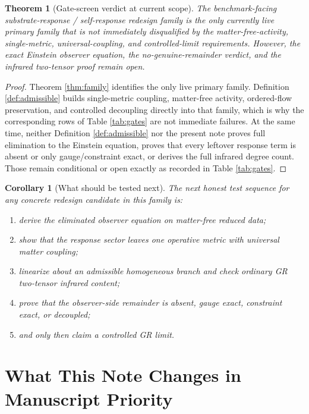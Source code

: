 \documentclass[11pt]{article}
\newtheorem{corollary}{Corollary}
\newtheorem{theorem}{Theorem}
\begin{document}
\begin{theorem}[Gate-screen verdict at current scope]
\label{thm:gates}
The benchmark-facing substrate-response / self-response redesign family is the only currently live primary family that is not immediately disqualified by the matter-free-activity, single-metric, universal-coupling, and controlled-limit requirements. However, the exact Einstein observer equation, the no-genuine-remainder verdict, and the infrared two-tensor proof remain open.
\end{theorem}

\begin{proof}
Theorem \ref{thm:family} identifies the only live primary family. Definition \ref{def:admissible} builds single-metric coupling, matter-free activity, ordered-flow preservation, and controlled decoupling directly into that family, which is why the corresponding rows of Table \ref{tab:gates} are not immediate failures. At the same time, neither Definition \ref{def:admissible} nor the present note proves full elimination to the Einstein equation, proves that every leftover response term is absent or only gauge/constraint exact, or derives the full infrared degree count. Those remain conditional or open exactly as recorded in Table \ref{tab:gates}.
\end{proof}

\begin{corollary}[What should be tested next]
\label{cor:next}
The next honest test sequence for any concrete redesign candidate in this family is:
\begin{enumerate}
    \item derive the eliminated observer equation on matter-free reduced data;
    \item show that the response sector leaves one operative metric with universal matter coupling;
    \item linearize about an admissible homogeneous branch and check ordinary GR two-tensor infrared content;
    \item prove that the observer-side remainder is absent, gauge exact, constraint exact, or decoupled;
    \item and only then claim a controlled GR limit.
\end{enumerate}
\end{corollary}

\section{What This Note Changes in Manuscript Priority}
\end{document}
